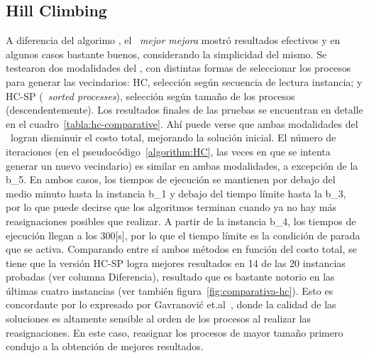 \documentclass[../informe2.tex]{subfiles}
\begin{document}
\subsection{Hill Climbing}
A diferencia del algorimo \greedy, el \hillc\ \textit{mejor mejora} mostró resultados efectivos y en algunos casos bastante buenos, considerando la simplicidad del mismo. Se testearon dos modalidades del \hillc, con distintas formas de seleccionar los procesos para generar las vecindarios: HC, selección según secuencia de lectura instancia; y HC-SP (\hillc\ \textit{sorted processes}), selección según tamaño de los procesos (descendentemente). Los resultados finales de las pruebas se encuentran en detalle en el cuadro~\ref{tabla:hc-comparative}. Ahí puede verse que ambas modalidades del \hillc\  logran disminuir el costo total, mejorando la solución inicial. El número de iteraciones (en el pseudocódigo~\ref{algorithm:HC}, las veces en que se intenta generar un nuevo vecindario) es similar en ambas modalidades, a excepción de la b\_5. En ambos casos, los tiempos de ejecución se mantienen por debajo del medio minuto hasta la instancia b\_1 y debajo del tiempo límite hasta la b\_3, por lo que puede decirse que los algoritmos terminan cuando ya no hay más reasignaciones posibles que realizar. A partir de la instancia b\_4, los tiempos de ejecución llegan  a los 300[s], por lo que el tiempo límite es la condición de parada que se activa. Comparando entre       sí ambos métodos en función del costo total, se tiene que la versión HC-SP logra mejores resultados en 14 de las 20 instancias probadas (ver columna Diferencia), resultado que es bastante notorio en las últimas cuatro instancias (ver también figura~\ref{fig:comparativa-hc}). Esto es concordante por lo expresado por Gavranović et.al~\cite{gavranovicefficient}, donde la calidad de las soluciones es altamente sensible al orden de los procesos al realizar las reasignaciones. En este caso, reasignar los procesos de mayor tamaño primero condujo a la obtención de mejores resultados. \par
\end{document}
